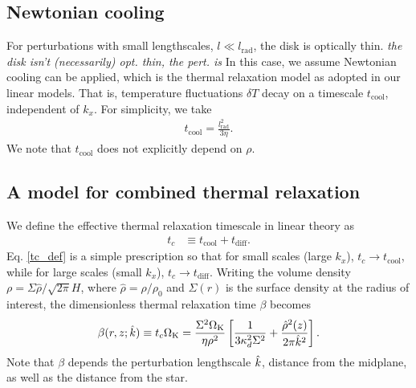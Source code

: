 {\subsection{Newtonian cooling}\label{newton_cool}
For perturbations with small lengthscales, $l\ll l_\mathrm{rad}$, 
the disk is optically thin.
\emph{the disk isn't (necessarily) opt. thin, the pert. is}
 In this case, we assume 
Newtonian cooling can be applied, which is the thermal
relaxation model as adopted in our linear models. That is, temperature
fluctuations $\delta T$ decay on a timescale $t_\mathrm{cool}$,
independent of $k_x$. For simplicity, we take  
\begin{align}
  t_\mathrm{cool} = \frac{l_\mathrm{rad}^2}{3\eta}. 
\end{align}
We note that $t_\mathrm{cool}$ does not explicitly depend on $\rho$. 

\subsection{A model for combined thermal relaxation}\label{toy_relax}
We define the effective thermal relaxation timescale in linear theory as
\begin{align}\label{tc_def}
  t_c &\equiv t_\mathrm{cool} + t _\mathrm{diff}. %
\end{align}
Eq. \ref{tc_def} is a simple prescription so
that for small scales (large $k_x$), $t_c\to t_\mathrm{cool}$, while
for large scales (small $k_x$), $t_c\to t_\mathrm{diff}$. Writing the
volume density $\rho = \Sigma\hat{\rho}/\sqrt{2\pi}H$, where
$\hat{\rho} = \rho/\rho_0$ and $\Sigma(r)$ is the surface density at the
radius of interest, the dimensionless thermal
relaxation time $\beta$ becomes 
\begin{align}\label{real_beta}
  \beta(r,z;\hat{k}) \equiv t_c\Omega_{\rm K} =
  \frac{\Sigma^2\Omega_{\rm K}}{\eta\rho^2}\left[\frac{1}{3\kappa_d^2\Sigma^2} 
    + \frac{\hat{\rho}^2(z)}{2\pi \hat{k}^2}\right].
\end{align}
Note that $\beta$ depends the perturbation lengthscale $\hat{k}$,
distance from the midplane, as well as the distance from the star.  

}
